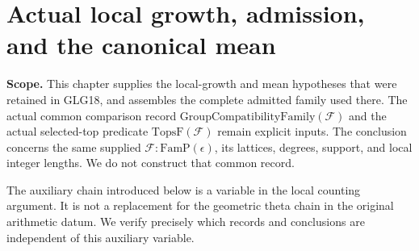 \section{Actual local growth, admission, and the canonical mean}
\label{sec:local-growth-suppliers-v047}

\noindent\textbf{Scope.}
This chapter supplies the local-growth and mean hypotheses that were
retained in GLG18, and assembles the complete admitted family used
there.  The actual common comparison record
\(\mathrm{GroupCompatibilityFamily}(\mathcal F)\) and the actual
selected-top predicate \(\mathrm{TopsF}(\mathcal F)\) remain explicit
inputs.  The conclusion concerns the same supplied
\(\mathcal F:\mathrm{FamP}(\epsilon)\), its lattices, degrees, support,
and local integer lengths.  We do not construct that common record.

The auxiliary chain introduced below is a variable in the local
counting argument.  It is not a replacement for the geometric theta
chain in the original arithmetic datum.  We verify precisely which
records and conclusions are independent of this auxiliary variable.

